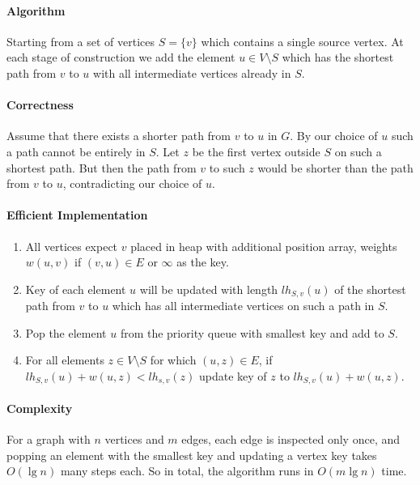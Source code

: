 \paragraph{Algorithm}
Starting from a set of vertices \(S = \{v\}\) which contains a single source vertex. At each
stage of construction we add the element \(u \in V \setminus S\) which has the shortest path
from \(v\) to \(u\) with all intermediate vertices already in \(S\).

\paragraph{Correctness}
Assume that there exists a shorter path from \(v\) to \(u\) in \(G\). By our choice of \(u\)
such a path cannot be entirely in \(S\). Let \(z\) be the first vertex outside \(S\) on 
such a shortest path. But then the path from \(v\) to such \(z\) would be shorter than the path
from \(v\) to \(u\), contradicting our choice of \(u\).

\paragraph{Efficient Implementation}
\begin{enumerate}
    \item All vertices expect \(v\) placed in heap with additional position array, weights
    \(w(u, v)\) if \((v, u)\in E\) or \(\infty\) as the key.
    \item Key of each element \(u\) will be updated with length \(lh_{S,v} (u)\) of the 
    shortest path from \(v\) to \(u\) which has all intermediate vertices on such a 
    path in \(S\).
    \item Pop the element \(u\) from the priority queue  with smallest key and add to \(S\).
    \item For all elements \(z \in V \setminus S\) for which \((u,z) \in E\), if 
    \(lh_{S,v} (u) + w(u, z) < lh_{s,v} (z)\) update key of \(z\) to \(lh_{S,v} (u) + w(u, z)\).
\end{enumerate} 

\paragraph{Complexity} For a graph with \(n\) vertices and \(m\) edges, each edge is 
inspected only once, and popping an element with the smallest key and updating a vertex 
key takes \(O(\lg n)\) many steps each. So in total, the algorithm runs in \(O(m\lg n)\) time.

